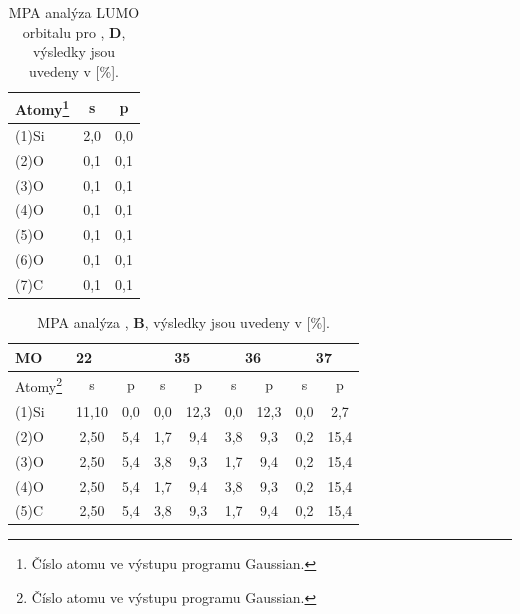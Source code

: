 \documentclass[
  digital, %
  table,   %
  lof,     %
  lot,     %
  oneside,
]{fithesis3}
\begin{document}
\begin{table}[htbp]
  \begin{minipage}{\textwidth}
\caption{MPA analýza LUMO orbitalu pro , \textbf{D}, výsledky jsou uvedeny v [\%].}
\begin{center}
\begin{tabular}{|l|c|c|}
\hline
 \label{si_och3_6_MPA}  Atomy\footnote{Číslo atomu ve výstupu programu Gaussian.}& \multicolumn{1}{c|}{s} & \multicolumn{1}{c|}{p} \\ \hline
(1)Si & 2,0  & 0,0  \\ \hline
(2)O & 0,1  & 0,1  \\ \hline
(3)O & 0,1  & 0,1  \\ \hline
(4)O & 0,1  & 0,1  \\ \hline
(5)O & 0,1  & 0,1  \\ \hline
(6)O & 0,1  & 0,1  \\ \hline
(7)C & 0,1  & 0,1  \\ \hline
\end{tabular}
\end{center}
\end{minipage}
\end{table}

\begin{table}[htbp] \begin{minipage}{\textwidth}
\caption{MPA analýza , \textbf{B}, výsledky jsou uvedeny v [\%].}
\begin{center}
\begin{tabular}{|l|c|c|c|c|c|c|c|c|}
\hline
\label{si_och3_4_MPA}MO& \multicolumn{2}{l|}{22} &   \multicolumn{2}{c|}{35} &  \multicolumn{2}{c|}{36} &  \multicolumn{2}{c|}{37} \\ \hline
 Atomy\footnote{Číslo atomu ve výstupu programu Gaussian.}& s & p & s &p & s & p & s & p \\ \hline
(1)Si & 11,10   & 0,0  & 0,0  & 12,3  & 0,0  & 12,3  & 0,0  & 2,7  \\ \hline
(2)O & 2,50   & 5,4  & 1,7  & 9,4  & 3,8  & 9,3  & 0,2  & 15,4  \\ \hline
(3)O & 2,50   & 5,4  & 3,8  & 9,3  & 1,7  & 9,4  & 0,2  & 15,4  \\ \hline
(4)O & 2,50   & 5,4  & 1,7  & 9,4  & 3,8  & 9,3  & 0,2  & 15,4  \\ \hline
(5)C & 2,50   & 5,4  & 3,8  & 9,3  & 1,7  & 9,4  & 0,2  & 15,4  \\ \hline
\end{tabular}
\end{center}
\end{minipage}
\end{table}
\end{document}
